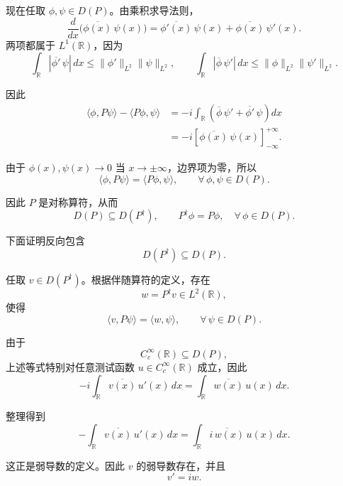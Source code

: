 \documentclass[UTF8,a4paper,11pt,openany]{ctexbook}
\begin{document}
\begin{proofblock}
现在任取 $\phi,\psi\in D(P)$。由乘积求导法则，
\[
\frac{d}{dx}
\bigl(
    \overline{\phi(x)}\,\psi(x)
\bigr)
=
\overline{\phi'(x)}\,\psi(x)
+
\overline{\phi(x)}\,\psi'(x).
\]
两项都属于 $L^1(\mathbb R)$，因为
\[
\int_{\mathbb R}
|\overline{\phi'}\,\psi|\,dx
\leq
\|\phi'\|_{L^2}\|\psi\|_{L^2},
\qquad
\int_{\mathbb R}
|\overline{\phi}\,\psi'|\,dx
\leq
\|\phi\|_{L^2}\|\psi'\|_{L^2}.
\]

因此
\begin{align}
    \langle\phi,P\psi\rangle
    -
    \langle P\phi,\psi\rangle
    &=
    -i\int_{\mathbb R}
    \left(
        \overline{\phi}\,\psi'
        +
        \overline{\phi'}\,\psi
    \right)dx
    \nonumber\\
    &=
    -i
    \left[
        \overline{\phi(x)}\,\psi(x)
    \right]_{-\infty}^{+\infty}.
\end{align}

由于 $\phi(x),\psi(x)\to0$ 当 $x\to\pm\infty$，边界项为零，所以
\begin{equation}
    \langle\phi,P\psi\rangle
    =
    \langle P\phi,\psi\rangle,
    \qquad
    \forall\,\phi,\psi\in D(P).
\end{equation}

因此 $P$ 是对称算符，从而
\begin{equation}
    D(P)\subseteq D(P^\dagger),
    \qquad
    P^\dagger\phi=P\phi,
    \quad
    \forall\,\phi\in D(P).
\end{equation}

下面证明反向包含
\[
D(P^\dagger)\subseteq D(P).
\]

任取 $v\in D(P^\dagger)$。根据伴随算符的定义，存在
\[
w=P^\dagger v\in L^2(\mathbb R),
\]
使得
\begin{equation}
    \langle v,P\psi\rangle
    =
    \langle w,\psi\rangle,
    \qquad
    \forall\,\psi\in D(P).
\end{equation}

由于
\[
C_c^\infty(\mathbb R)\subseteq D(P),
\]
上述等式特别对任意测试函数 $u\in C_c^\infty(\mathbb R)$ 成立，因此
\[
-i
\int_{\mathbb R}
\overline{v(x)}\,u'(x)\,dx
=
\int_{\mathbb R}
\overline{w(x)}\,u(x)\,dx.
\]

整理得到
\begin{equation}
    -
    \int_{\mathbb R}
    \overline{v(x)}\,u'(x)\,dx
    =
    \int_{\mathbb R}
    \overline{i\,w(x)}\,u(x)\,dx.
\end{equation}

这正是弱导数的定义。因此 $v$ 的弱导数存在，并且
\begin{equation}
    v'=iw.
\end{equation}


\end{proofblock}
\end{document}
